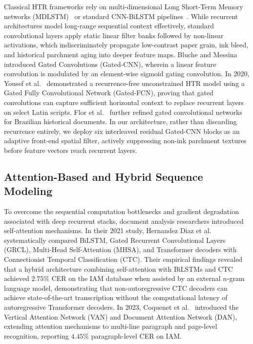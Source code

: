 \documentclass{IEEEtran}
\begin{document}
Classical HTR frameworks rely on multi-dimensional Long Short-Term Memory networks (MDLSTM)~\cite{graves2009} or standard CNN-BiLSTM pipelines~\cite{puigcerver2017multidimensional}. While recurrent architectures model long-range sequential context effectively, standard convolutional layers apply static linear filter banks followed by non-linear activations, which indiscriminately propagate low-contrast paper grain, ink bleed, and historical parchment aging into deeper feature maps. Bluche and Messina~\cite{bluche2017gated} introduced Gated Convolutions (Gated-CNN), wherein a linear feature convolution is modulated by an element-wise sigmoid gating convolution. In 2020, Yousef et al.~\cite{yousef2020} demonstrated a recurrence-free unconstrained HTR model using a Gated Fully Convolutional Network (Gated-FCN), proving that gated convolutions can capture sufficient horizontal context to replace recurrent layers on select Latin scripts. Flor et al.~\cite{flor2020gated} further refined gated convolutional networks for Brazilian historical documents. In our architecture, rather than discarding recurrence entirely, we deploy six interleaved residual Gated-CNN blocks as an adaptive front-end spatial filter, actively suppressing non-ink parchment textures before feature vectors reach recurrent layers.

\subsection{Attention-Based and Hybrid Sequence Modeling}

To overcome the sequential computation bottlenecks and gradient degradation associated with deep recurrent stacks, document analysis researchers introduced self-attention mechanisms. In their 2021 study, Hernandez Diaz et al.~\cite{diaz2021rethinking} systematically compared BiLSTM, Gated Recurrent Convolutional Layers (GRCL), Multi-Head Self-Attention (MHSA), and Transformer decoders with Connectionist Temporal Classification (CTC). Their empirical findings revealed that a hybrid architecture combining self-attention with BiLSTMs and CTC achieved $2.75\%$ CER on the IAM database when assisted by an external $n$-gram language model, demonstrating that non-autoregressive CTC decoders can achieve state-of-the-art transcription without the computational latency of autoregressive Transformer decoders. In 2023, Coquenet et al.~\cite{coquenet2023dan} introduced the Vertical Attention Network (VAN) and Document Attention Network (DAN), extending attention mechanisms to multi-line paragraph and page-level recognition, reporting $4.45\%$ paragraph-level CER on IAM.
\end{document}
